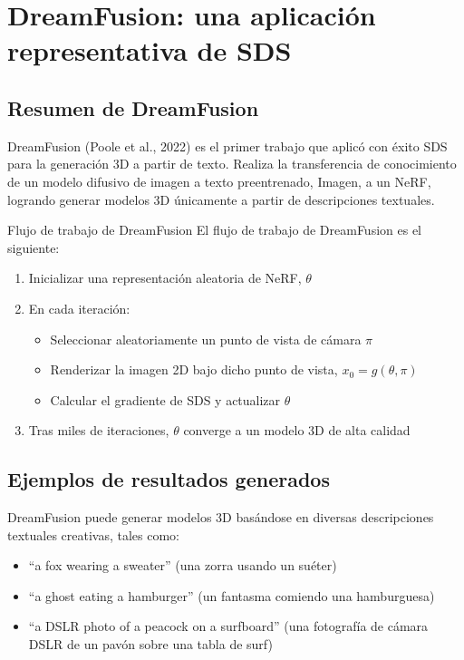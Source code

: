 \section{DreamFusion: una aplicación representativa de SDS}

\subsection{Resumen de DreamFusion}

DreamFusion (Poole et al., 2022) es el primer trabajo que aplicó con éxito SDS para la generación 3D a partir de texto. Realiza la transferencia de conocimiento de un modelo difusivo de imagen a texto preentrenado, Imagen, a un NeRF, logrando generar modelos 3D únicamente a partir de descripciones textuales.

\begin{importantbox}{Flujo de trabajo de DreamFusion}
El flujo de trabajo de DreamFusion es el siguiente:
\begin{enumerate}
    \item Inicializar una representación aleatoria de NeRF, $\theta$
    \item En cada iteración:
    \begin{itemize}
        \item Seleccionar aleatoriamente un punto de vista de cámara $\pi$
        \item Renderizar la imagen 2D bajo dicho punto de vista, $x_0 = g(\theta, \pi)$
        \item Calcular el gradiente de SDS y actualizar $\theta$
    \end{itemize}
    \item Tras miles de iteraciones, $\theta$ converge a un modelo 3D de alta calidad
\end{enumerate}
\end{importantbox}

\subsection{Ejemplos de resultados generados}

DreamFusion puede generar modelos 3D basándose en diversas descripciones textuales creativas, tales como:
\begin{itemize}
    \item ``a fox wearing a sweater'' (una zorra usando un suéter)
    \item ``a ghost eating a hamburger'' (un fantasma comiendo una hamburguesa)
    \item ``a DSLR photo of a peacock on a surfboard'' (una fotografía de cámara DSLR de un pavón sobre una tabla de surf)
\end{itemize}

